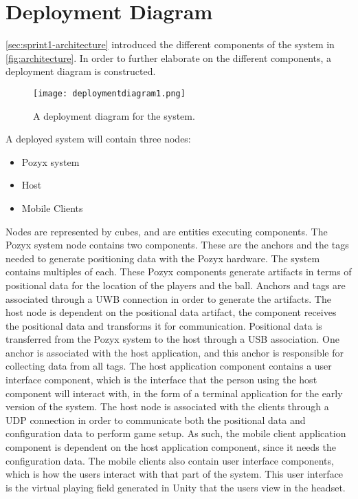 \section{Deployment Diagram}\label{sec:sprint2-deploymentdia}
\autoref{sec:sprint1-architecture} introduced the different components of the system in \autoref{fig:architecture}.
In order to further elaborate on the different components, a deployment diagram is constructed.
\begin{figure}[H]
    \centering
    \texttt{[image: deploymentdiagram1.png]}
    \caption{A deployment diagram for the system.}
    \label{fig:sprint2-deployment}
\end{figure}
\noindent
A deployed system will contain three nodes:
\begin{itemize}
    \item Pozyx system
    \item Host
    \item Mobile Clients
\end{itemize}
Nodes are represented by cubes, and are entities executing components.
The Pozyx system node contains two components.
These are the anchors and the tags needed to generate positioning data with the Pozyx hardware.
The system contains multiples of each.
These Pozyx components generate artifacts in terms of positional data for the location of the players and the ball.
Anchors and tags are associated through a UWB connection in order to generate the artifacts.
The host node is dependent on the positional data artifact, the component receives the positional data and transforms it for communication.
Positional data is transferred from the Pozyx system to the host through a USB association.
One anchor is associated with the host application, and this anchor is responsible for collecting data from all tags.
The host application component contains a user interface component, which is the interface that the person using the host component will interact with, in the form of a terminal application for the early version of the system.
The host node is associated with the clients through a UDP connection in order to communicate both the positional data and configuration data to perform game setup.
As such, the mobile client application component is dependent on the host application component, since it needs the configuration data.
The mobile clients also contain user interface components, which is how the users interact with that part of the system.
This user interface is the virtual playing field generated in Unity that the users view in the headset.
